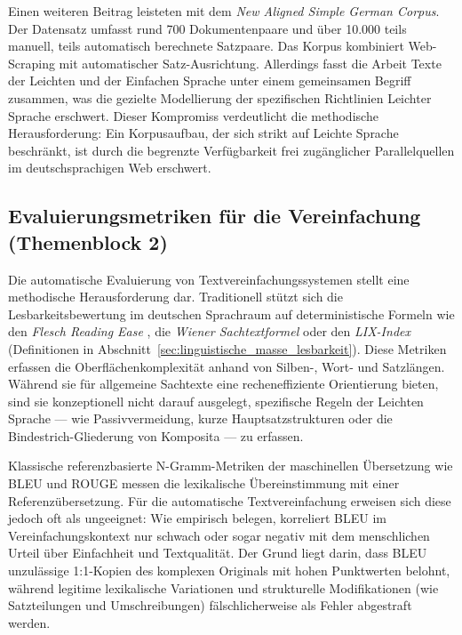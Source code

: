 Einen weiteren Beitrag leisteten \citet{toborek2023new} mit dem \textit{New Aligned Simple German Corpus}. Der Datensatz umfasst rund 700 Dokumentenpaare und über 10.000 teils manuell, teils automatisch berechnete Satzpaare. Das Korpus kombiniert Web-Scraping mit automatischer Satz-Ausrichtung. Allerdings fasst die Arbeit Texte der Leichten und der Einfachen Sprache unter einem gemeinsamen Begriff zusammen, was die gezielte Modellierung der spezifischen Richtlinien Leichter Sprache erschwert. Dieser Kompromiss verdeutlicht die methodische Herausforderung: Ein Korpusaufbau, der sich strikt auf Leichte Sprache beschränkt, ist durch die begrenzte Verfügbarkeit frei zugänglicher Parallelquellen im deutschsprachigen Web erschwert.

\subsection{Evaluierungsmetriken für die Vereinfachung (Themenblock 2)}
\label{sec:evaluierungsmetriken}

Die automatische Evaluierung von Textvereinfachungssystemen stellt eine methodische Herausforderung dar. Traditionell stützt sich die Lesbarkeitsbewertung im deutschen Sprachraum auf deterministische Formeln wie den \textit{Flesch Reading Ease} \citep{amstad1978verstaendlich}, die \textit{Wiener Sachtextformel} \citep{bamberger1984lesen} oder den \textit{LIX-Index} \citep{bjornsson1968readability} (Definitionen in Abschnitt~\ref{sec:linguistische_masse_lesbarkeit}). Diese Metriken erfassen die Oberflächenkomplexität anhand von Silben-, Wort- und Satzlängen. Während sie für allgemeine Sachtexte eine recheneffiziente Orientierung bieten, sind sie konzeptionell nicht darauf ausgelegt, spezifische Regeln der Leichten Sprache — wie Passivvermeidung, kurze Hauptsatzstrukturen oder die Bindestrich-Gliederung von Komposita — zu erfassen.

Klassische referenzbasierte N-Gramm-Metriken der maschinellen Übersetzung wie BLEU \citep{papineni2002bleu} und ROUGE \citep{lin2004rouge} messen die lexikalische Übereinstimmung mit einer Referenzübersetzung. Für die automatische Textvereinfachung erweisen sich diese jedoch oft als ungeeignet: Wie \citet{alva2021unsuitability} empirisch belegen, korreliert BLEU im Vereinfachungskontext nur schwach oder sogar negativ mit dem menschlichen Urteil über Einfachheit und Textqualität. Der Grund liegt darin, dass BLEU unzulässige 1:1-Kopien des komplexen Originals mit hohen Punktwerten belohnt, während legitime lexikalische Variationen und strukturelle Modifikationen (wie Satzteilungen und Umschreibungen) fälschlicherweise als Fehler abgestraft werden.

